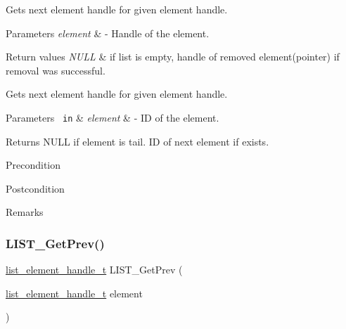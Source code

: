 Gets next element handle for given element handle. 


\begin{DoxyParams}{Parameters}
{\em element} & -\/ Handle of the element.\\
\hline
\end{DoxyParams}

\begin{DoxyRetVals}{Return values}
{\em N\+U\+LL} & if list is empty, handle of removed element(pointer) if removal was successful.\\
\hline
\end{DoxyRetVals}
Gets next element handle for given element handle.



 
\begin{DoxyParams}[1]{Parameters}
\mbox{\texttt{ in}}  & {\em element} & -\/ ID of the element.\\
\hline
\end{DoxyParams}
\begin{DoxyReturn}{Returns}
N\+U\+LL if element is tail. ID of next element if exists.
\end{DoxyReturn}
\begin{DoxyPrecond}{Precondition}

\end{DoxyPrecond}
\begin{DoxyPostcond}{Postcondition}

\end{DoxyPostcond}
\begin{DoxyRemark}{Remarks}
\begin{DoxyVerb}\end{DoxyVerb}
 
\end{DoxyRemark}
\mbox{\label{group___generic_list_ga745fa7114f0facf6edb011e2c7139aa4}} 
\subsubsection{\texorpdfstring{LIST\_GetPrev()}{LIST\_GetPrev()}}
{\footnotesize\ttfamily \mbox{\hyperlink{structlist__element__tag}{list\+\_\+element\+\_\+handle\+\_\+t}} L\+I\+S\+T\+\_\+\+Get\+Prev (\begin{DoxyParamCaption}\item[{\mbox{\hyperlink{structlist__element__tag}{list\+\_\+element\+\_\+handle\+\_\+t}}}]{element }\end{DoxyParamCaption})}



